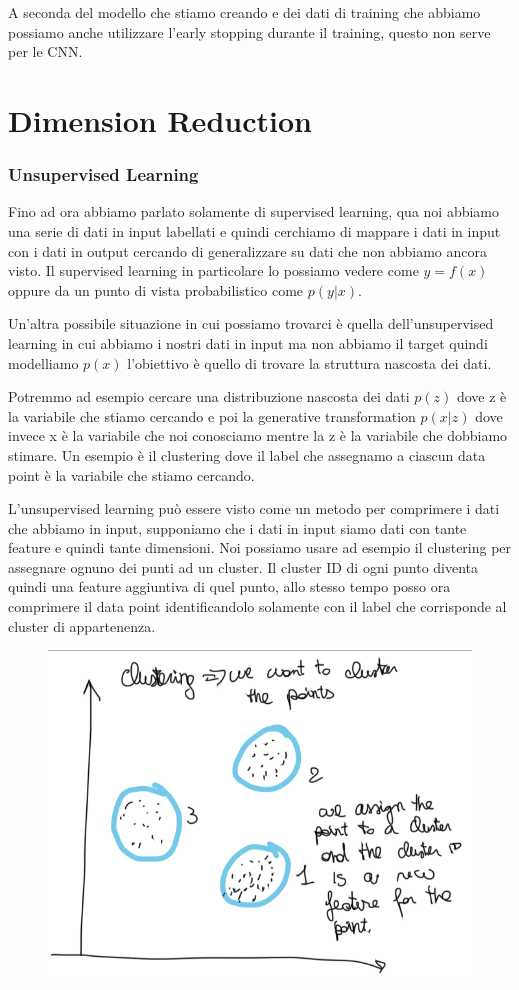 \documentclass[14pt]{extreport}
\begin{document}
A seconda del modello che stiamo creando e dei dati di training che abbiamo possiamo anche utilizzare l'early stopping durante il training, questo
non serve per le CNN.


\chapter{Dimension Reduction}

\subsection{Unsupervised Learning}

Fino ad ora abbiamo parlato solamente di supervised learning, qua noi abbiamo una serie di dati in input labellati e quindi cerchiamo di mappare i dati in input
con i dati in output cercando di generalizzare su dati che non abbiamo ancora visto.
Il supervised learning in particolare lo possiamo vedere come $y=f(x)$ oppure da un punto di vista probabilistico come $p(y|x)$.

Un'altra possibile situazione in cui possiamo trovarci è quella dell'unsupervised learning in cui abbiamo i nostri dati in input
ma non abbiamo il target quindi modelliamo $p(x)$ l'obiettivo è quello di trovare la struttura nascosta dei dati.

Potremmo ad esempio cercare una distribuzione nascosta dei dati $p(z)$ dove z è la variabile che stiamo cercando 
e poi la generative transformation $p(x|z)$ dove invece x è la variabile che noi conosciamo mentre la z è la variabile che 
dobbiamo stimare.
Un esempio è il clustering dove il label che assegnamo a ciascun data point è la variabile che stiamo cercando.

L'unsupervised learning può essere visto come un metodo per comprimere i dati che abbiamo in input, supponiamo che i dati in input
siamo dati con tante feature e quindi tante dimensioni. Noi possiamo usare ad esempio il clustering per assegnare ognuno dei punti
ad un cluster. Il cluster ID di ogni punto diventa quindi una feature aggiuntiva di quel punto, allo stesso tempo posso ora
comprimere il data point identificandolo solamente con il label che corrisponde al cluster di appartenenza.

\begin{figure}[H]
\centering
\includegraphics[width=0.4\linewidth]{434.jpeg}
\end{figure}
\end{document}
